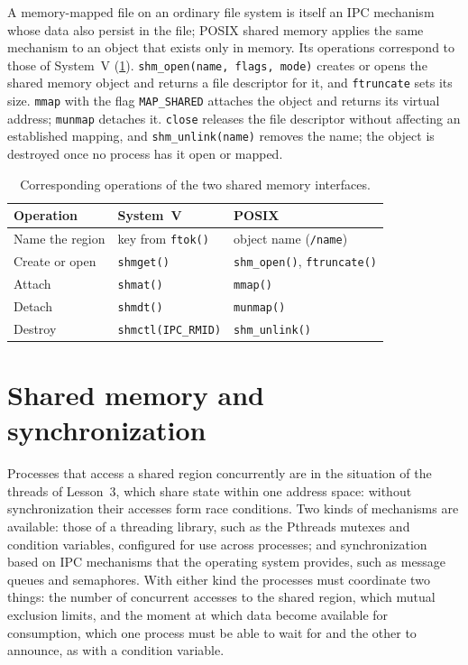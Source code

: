 \documentclass[../main.tex]{subfiles}
\begin{document}
A memory-mapped file on an ordinary file system is itself an IPC mechanism
whose data also persist in the file; POSIX shared memory applies the same
mechanism to an object that exists only in memory.  Its operations correspond
to those of System~V (\cref{tab:l09-shm-api}).
\texttt{shm\_open(name, flags, mode)} creates or opens the shared memory
object and returns a file descriptor for it, and \texttt{ftruncate} sets
its size.
\texttt{mmap} with the flag \texttt{MAP\_SHARED} attaches the
object and returns its virtual address; \texttt{munmap} detaches
it.
\texttt{close} releases the file descriptor without affecting an
established mapping, and \texttt{shm\_unlink(name)} removes the name; the
object is destroyed once no process has it open or mapped.

\begin{table}[htbp]
  \centering
  \caption{Corresponding operations of the two shared memory interfaces.}
  \label{tab:l09-shm-api}
  \small
  \begin{tabular}{@{}lll@{}}
    \toprule
    Operation & System~V & POSIX \\
    \midrule
    Name the region & key from \texttt{ftok()} & object name (\texttt{/name}) \\
    Create or open & \texttt{shmget()} & \texttt{shm\_open()}, \texttt{ftruncate()} \\
    Attach & \texttt{shmat()} & \texttt{mmap()} \\
    Detach & \texttt{shmdt()} & \texttt{munmap()} \\
    Destroy & \texttt{shmctl(IPC\_RMID)} & \texttt{shm\_unlink()} \\
    \bottomrule
  \end{tabular}
\end{table}

\section{Shared memory and synchronization}
\label{sec:l09-sync}

Processes that access a shared region concurrently are in the situation of
the threads of Lesson~3, which share state within one address space: without
synchronization their accesses form race conditions.  Two kinds of mechanisms
are available: those of a threading library, such as the Pthreads mutexes
and condition variables, configured for use across processes; and
synchronization based on IPC mechanisms that the operating system provides,
such as message queues and semaphores.  With either kind the processes must
coordinate two things: the number of concurrent accesses to the shared
region, which mutual exclusion limits, and the moment at which data become
available for consumption, which one process must be able to wait for and
the other to announce, as with a condition variable.
\end{document}
